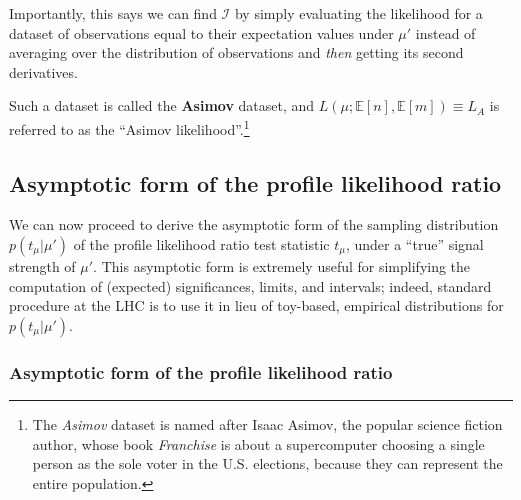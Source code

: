 Importantly, this says we can find $\mathcal I$ by simply evaluating the likelihood for a dataset of observations equal to their expectation values under $\mu'$ instead of averaging over the distribution of observations and \textit{then} getting its second derivatives.

\begin{definition}
Such a dataset is called the \textbf{Asimov} dataset, and $L(\mu; \mathbb E[n], \mathbb E[m]) \equiv L_A$ is referred to as the ``Asimov likelihood''.\footnote{The \textit{Asimov} dataset is named after Isaac Asimov, the popular science fiction author, whose book \textit{Franchise} is about a supercomputer choosing a single person as the sole voter in the U.S. elections, because they can represent the entire population.}
\end{definition}



\subsection{Asymptotic form of the profile likelihood ratio}
\label{sec:03_asymptotic_plr}

We can now proceed to derive the asymptotic form of the sampling distribution $p(t_\mu|\mu')$ of the profile likelihood ratio test statistic $t_\mu$, under a ``true'' signal strength of $\mu'$.
This asymptotic form is extremely useful for simplifying the computation of (expected) significances, limits, and intervals; indeed, standard procedure at the LHC is to use it in lieu of toy-based, empirical distributions for $p(t_\mu|\mu')$.


\subsubsection{Asymptotic form of the profile likelihood ratio}


